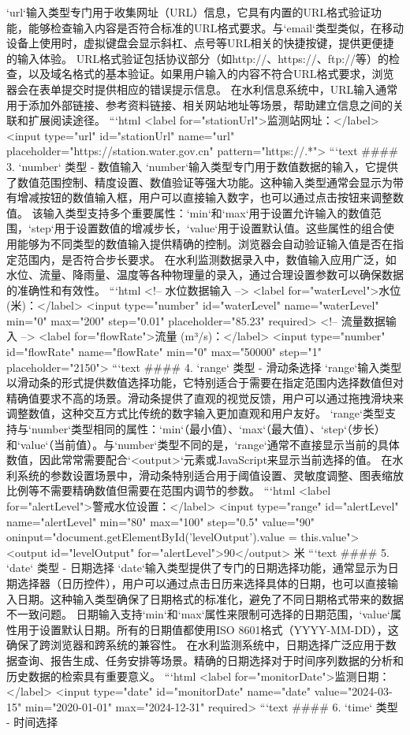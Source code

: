 `url`输入类型专门用于收集网址（URL）信息，它具有内置的URL格式验证功能，能够检查输入内容是否符合标准的URL格式要求。与`email`类型类似，在移动设备上使用时，虚拟键盘会显示斜杠、点号等URL相关的快捷按键，提供更便捷的输入体验。 URL格式验证包括协议部分（如http://、https://、ftp://等）的检查，以及域名格式的基本验证。如果用户输入的内容不符合URL格式要求，浏览器会在表单提交时提供相应的错误提示信息。 在水利信息系统中，URL输入通常用于添加外部链接、参考资料链接、相关网站地址等场景，帮助建立信息之间的关联和扩展阅读途径。 ```html <label for="stationUrl">监测站网址：</label> <input type="url" id="stationUrl" name="url" placeholder="https://station.water.gov.cn" pattern="https://.*"> ```text #### 3. `number` 类型 - 数值输入 `number`输入类型专门用于数值数据的输入，它提供了数值范围控制、精度设置、数值验证等强大功能。这种输入类型通常会显示为带有增减按钮的数值输入框，用户可以直接输入数字，也可以通过点击按钮来调整数值。 该输入类型支持多个重要属性：`min`和`max`用于设置允许输入的数值范围，`step`用于设置数值的增减步长，`value`用于设置默认值。这些属性的组合使用能够为不同类型的数值输入提供精确的控制。浏览器会自动验证输入值是否在指定范围内，是否符合步长要求。 在水利监测数据录入中，数值输入应用广泛，如水位、流量、降雨量、温度等各种物理量的录入，通过合理设置参数可以确保数据的准确性和有效性。 ```html <!-- 水位数据输入 --> <label for="waterLevel">水位 (米)：</label> <input type="number" id="waterLevel" name="waterLevel" min="0" max="200" step="0.01" placeholder="85.23" required> <!-- 流量数据输入 --> <label for="flowRate">流量 (m³/s)：</label> <input type="number" id="flowRate" name="flowRate" min="0" max="50000" step="1" placeholder="2150"> ```text #### 4. `range` 类型 - 滑动条选择 `range`输入类型以滑动条的形式提供数值选择功能，它特别适合于需要在指定范围内选择数值但对精确值要求不高的场景。滑动条提供了直观的视觉反馈，用户可以通过拖拽滑块来调整数值，这种交互方式比传统的数字输入更加直观和用户友好。 `range`类型支持与`number`类型相同的属性：`min`（最小值）、`max`（最大值）、`step`（步长）和`value`（当前值）。与`number`类型不同的是，`range`通常不直接显示当前的具体数值，因此常常需要配合`<output>`元素或JavaScript来显示当前选择的值。 在水利系统的参数设置场景中，滑动条特别适合用于阈值设置、灵敏度调整、图表缩放比例等不需要精确数值但需要在范围内调节的参数。 ```html <label for="alertLevel">警戒水位设置：</label> <input type="range" id="alertLevel" name="alertLevel" min="80" max="100" step="0.5" value="90" oninput="document.getElementById('levelOutput').value = this.value"> <output id="levelOutput" for="alertLevel">90</output> 米 ```text #### 5. `date` 类型 - 日期选择 `date`输入类型提供了专门的日期选择功能，通常显示为日期选择器（日历控件），用户可以通过点击日历来选择具体的日期，也可以直接输入日期。这种输入类型确保了日期格式的标准化，避免了不同日期格式带来的数据不一致问题。 日期输入支持`min`和`max`属性来限制可选择的日期范围，`value`属性用于设置默认日期。所有的日期值都使用ISO 8601格式（YYYY-MM-DD），这确保了跨浏览器和跨系统的兼容性。 在水利监测系统中，日期选择广泛应用于数据查询、报告生成、任务安排等场景。精确的日期选择对于时间序列数据的分析和历史数据的检索具有重要意义。 ```html <label for="monitorDate">监测日期：</label> <input type="date" id="monitorDate" name="date" value="2024-03-15" min="2020-01-01" max="2024-12-31" required> ```text #### 6. `time` 类型 - 时间选择 